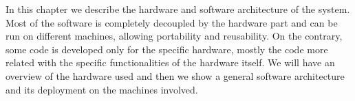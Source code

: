 In this chapter we describe the hardware and software architecture of the system.
Most of the software is completely decoupled by the hardware part and can be run
on different machines, allowing portability and reusability. On the contrary, some
code is developed only for the specific hardware, mostly the code more related with
the specific functionalities of the hardware itself. We will have an overview of the hardware
used and then we show a general software architecture and its deployment on the
machines involved.




